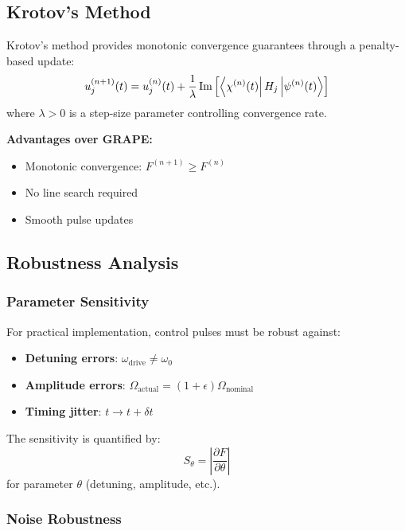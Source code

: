 \documentclass[11pt,a4paper]{article}
\theoremstyle{definition}
\theoremstyle{remark}
\begin{document}
\subsection{Krotov's Method}

Krotov's method provides monotonic convergence guarantees through a penalty-based update:
\begin{equation}
u_j^{(n+1)}(t) = u_j^{(n)}(t) + \frac{1}{\lambda} \Im\left[\bra{\chi^{(n)}(t)} H_j \ket{\psi^{(n)}(t)}\right]
\end{equation}
where $\lambda > 0$ is a step-size parameter controlling convergence rate.

\textbf{Advantages over GRAPE:}
\begin{itemize}
    \item Monotonic convergence: $F^{(n+1)} \geq F^{(n)}$
    \item No line search required
    \item Smooth pulse updates
\end{itemize}

\subsection{Robustness Analysis}

\subsubsection{Parameter Sensitivity}

For practical implementation, control pulses must be robust against:
\begin{itemize}
    \item \textbf{Detuning errors}: $\omega_{\text{drive}} \neq \omega_0$
    \item \textbf{Amplitude errors}: $\Omega_{\text{actual}} = (1+\epsilon)\Omega_{\text{nominal}}$
    \item \textbf{Timing jitter}: $t \rightarrow t + \delta t$
\end{itemize}

The sensitivity is quantified by:
\begin{equation}
S_\theta = \left|\frac{\partial F}{\partial \theta}\right|
\end{equation}
for parameter $\theta$ (detuning, amplitude, etc.).

\subsubsection{Noise Robustness}
\end{document}

